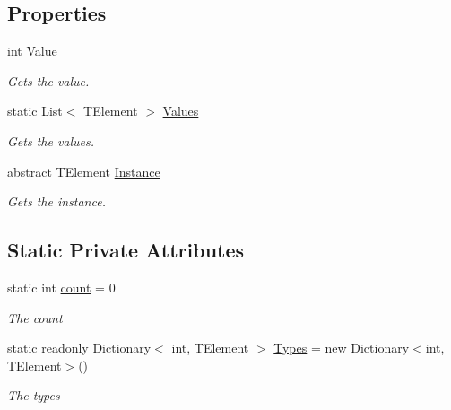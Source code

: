 \subsection*{Properties}
\begin{DoxyCompactItemize}
\item 
int \mbox{\hyperlink{class_bar_none_1_1_the_rack_1_1_core_1_1_map_enum_ac53ea5e35c9ca564f2d7a41b0efbbdb9}{Value}}
\begin{DoxyCompactList}\small\item\em Gets the value. \end{DoxyCompactList}\item 
static List$<$ T\+Element $>$ \mbox{\hyperlink{class_bar_none_1_1_the_rack_1_1_core_1_1_map_enum_ad06502517c6ae2ad52142a67a2abde4d}{Values}}
\begin{DoxyCompactList}\small\item\em Gets the values. \end{DoxyCompactList}\item 
abstract T\+Element \mbox{\hyperlink{class_bar_none_1_1_the_rack_1_1_core_1_1_map_enum_a222e515eb8c75cfc1938d31327218020}{Instance}}
\begin{DoxyCompactList}\small\item\em Gets the instance. \end{DoxyCompactList}\end{DoxyCompactItemize}
\subsection*{Static Private Attributes}
\begin{DoxyCompactItemize}
\item 
static int \mbox{\hyperlink{class_bar_none_1_1_the_rack_1_1_core_1_1_map_enum_a407380e58143a85b52a2a75ad5b0f018}{count}} = 0
\begin{DoxyCompactList}\small\item\em The count \end{DoxyCompactList}\item 
static readonly Dictionary$<$ int, T\+Element $>$ \mbox{\hyperlink{class_bar_none_1_1_the_rack_1_1_core_1_1_map_enum_af5c02c05b553fe5b0fdf3f4f67f83a95}{Types}} = new Dictionary$<$int, T\+Element$>$()
\begin{DoxyCompactList}\small\item\em The types \end{DoxyCompactList}\end{DoxyCompactItemize}


